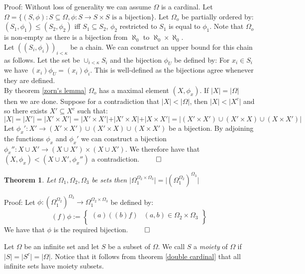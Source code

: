 \documentclass{report}
\newtheorem{theorem}{Theorem}[section]
\newenvironment{defn}[1][]{\refstepcounter{theorem}\begin{trivlist}
\item[\hskip \labelsep {\bfseries Definition  \thetheorem  \, \def\temp{#1}\ifx\temp\empty  #1\else  (#1)\fi
}]}   {\end{trivlist}}
\begin{document}
Proof: Without loss of generality we can assume $\Omega$ is a cardinal. Let $\Omega=\{(S,\phi):S \subseteq \Omega, \phi:S\rightarrow S \times S \text{ is a bijection}\}$. Let $\Omega_o$ be partially ordered by: $(S_1,\phi_1) \leq (S_2,\phi_2)$ iff $S_1 \subseteq S_2$, $\phi_2$ restricted to $S_1$ is equal to $\phi_1$. Note that $\Omega_o$ is non-empty as there is a bijection from $\aleph_0$ to $\aleph_0 \times \aleph_0$.\\
Let $((S_i,\phi_i))_{i<\kappa}$ be a chain. We can construct an upper bound for this chain as follows. Let the set be $\cup_{i<\kappa}S_i$ and the bijection $\phi_U$ be defined by: For $x_i \in S_i$ we have $(x_i)\phi_U=(x_i)\phi_i$. This is well-defined as the bijections agree whenever they are defined.\\
By theorem \ref{zorn's lemma} $\Omega_o$ has a maximal element $(X,\phi_x)$. If $\vert X \vert = \vert \Omega \vert$ then we are done. Suppose for a contradiction that $\vert X \vert < \vert \Omega \vert$, then $\vert X \vert < \vert X^c \vert$ and so there exists $X'\subseteq X^c$ such that:
\[\vert X \vert = \vert X' \vert = \vert X' \times X' \vert=\vert X' \times X' \vert + \vert X' \times X \vert + \vert X \times X' \vert= \vert (X' \times X') \cup (X' \times X) \cup (X \times X') \vert\]
Let $\phi_x':X' \rightarrow (X' \times X') \cup (X' \times X) \cup (X \times X')$ be a bijection. By adjoining the functions $\phi_x$ and $\phi_x'$ we can construct a bijection $\phi_x'':X\cup X' \rightarrow (X\cup X') \times (X\cup X')$. We therefore have that $(X,\phi_x)<(X\cup X',\phi_x'')$ a contradiction. $\qed$
\begin{theorem}
Let $\Omega_1,\Omega_2,\Omega_3$ be sets then $\vert \Omega_1^{\Omega_2 \times \Omega_3} \vert=\vert {(\Omega_1^{\Omega_2})}^{\Omega_3} \vert$
\end{theorem}\par
Proof: Let $\phi: {(\Omega_1^{\Omega_2})}^{\Omega_3} \rightarrow \Omega_1^{\Omega_2 \times \Omega_3}$ be defined by:
\[(f)\phi := \left\{
    \begin{array}{lr}
      (a)((b)f)&  (a,b) \in  \Omega_2 \times \Omega_3 \\
    \end{array}
    \right\}\]
We have that $\phi$ is the required bijection. $\qed$
\begin{defn}
Let $\Omega$ be an infinite set and let $S$ be a subset of $\Omega$. We call $S$ a \textit{moiety} of $\Omega$ if $\vert S\vert = \vert S^c \vert = \vert \Omega \vert$. Notice that it follows from theorem \ref{double cardinal} that all infinite sets have moiety subsets.
\end{defn}
\end{document}
